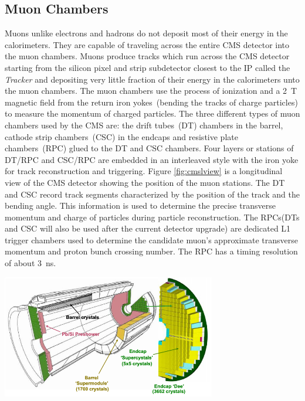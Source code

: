 \subsection{Muon Chambers}
Muons unlike electrons and hadrons do not deposit most of their energy in the calorimeters.
They are capable of traveling across the entire CMS detector into the muon chambers. Muons produce tracks which run across
the CMS detector starting from the silicon pixel and strip subdetector closest to the IP called the \textit{Tracker} and depositing very little fraction of their energy in the calorimeters unto the muon chambers. 
The muon chambers use the process of ionization and a 2~T magnetic field from the return iron yokes~(bending the tracks of charge particles) to measure the momentum of charged particles.
The three different types of muon chambers used by the CMS are: the drift tubes~(DT) chambers in the barrel, cathode strip chambers~(CSC) 
in the endcaps and resistive plate chambers~(RPC) glued to the DT and CSC chambers.
Four layers or stations of DT/RPC and CSC/RPC are embedded in an interleaved  style with the iron yoke for track reconstruction and triggering. Figure \ref{fig:cmslview} is a longitudinal view of the CMS detector showing the position of the muon stations.
The DT and CSC record track segments characterized by the position of the track and the bending angle. This information is used to determine the precise transverse momentum and charge of particles during particle reconstruction.
The RPCs(DTs and CSC will also be used after the current detector upgrade) are dedicated L1 trigger chambers used to determine the candidate muon's approximate transverse momentum and proton bunch crossing number. The RPC has a timing resolution of about 3~ns.
\clearpage
\begin{center}
\centering
\mbox{\includegraphics[height= 0.5\textwidth, width=0.7\textwidth]{THESISPLOTS/CMS-ECAL-EB-EE.png}}
\label{fig:CMSECAL}
\end{center}

